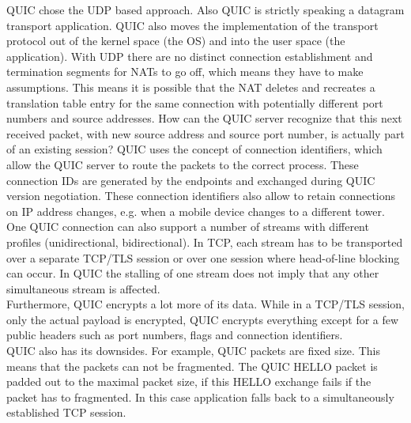 QUIC chose the UDP based approach. Also QUIC is strictly speaking a datagram transport application. QUIC also moves the implementation of the transport protocol out of the kernel space (the OS) and into the user space (the application). With UDP there are no distinct connection establishment and termination segments for NATs to go off, which means they have to make assumptions. This means it is possible that the NAT deletes and recreates a translation table entry for the same connection with potentially different port numbers and source addresses. How can the QUIC server recognize that this next received packet, with new source address and source port number, is actually part of an existing session? QUIC uses the concept of connection identifiers, which allow the QUIC server to route the packets to the correct process. These connection IDs are generated by the endpoints and exchanged during QUIC version negotiation. These connection identifiers also allow to retain connections on IP address changes, e.g. when a mobile device changes to a different tower.\vspace{.3cm}\\

One QUIC connection can also support a number of streams with different profiles (unidirectional, bidirectional). In TCP, each stream has to be transported over a separate TCP/TLS session or over one session where head-of-line blocking can occur. In QUIC the stalling of one stream does not imply that any other simultaneous stream is affected.\\
Furthermore, QUIC encrypts a lot more of its data. While in a TCP/TLS session, only the actual payload is encrypted, QUIC encrypts everything except for a few public headers such as port numbers, flags and connection identifiers.\vspace{.3cm}\\

QUIC also has its downsides. For example, QUIC packets are fixed size. This means that the packets can not be fragmented. The QUIC HELLO packet is padded out to the maximal packet size, if this HELLO exchange fails if the packet has to fragmented. In this case application falls back to a simultaneously established TCP session.

